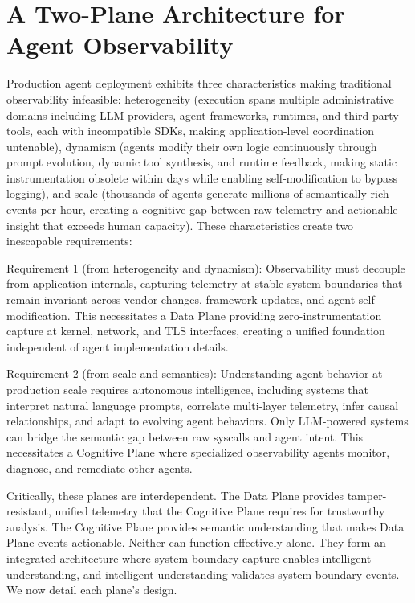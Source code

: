 \documentclass[sigplan,screen,9pt]{acmart}
\begin{document}
\section{A Two-Plane Architecture for Agent Observability}

Production agent deployment exhibits three characteristics making traditional observability infeasible: heterogeneity (execution spans multiple administrative domains including LLM providers, agent frameworks, runtimes, and third-party tools, each with incompatible SDKs, making application-level coordination untenable), dynamism (agents modify their own logic continuously through prompt evolution, dynamic tool synthesis, and runtime feedback, making static instrumentation obsolete within days while enabling self-modification to bypass logging), and scale (thousands of agents generate millions of semantically-rich events per hour, creating a cognitive gap between raw telemetry and actionable insight that exceeds human capacity). These characteristics create two inescapable requirements:

Requirement 1 (from heterogeneity and dynamism): Observability must decouple from application internals, capturing telemetry at stable system boundaries that remain invariant across vendor changes, framework updates, and agent self-modification. This necessitates a Data Plane providing zero-instrumentation capture at kernel, network, and TLS interfaces, creating a unified foundation independent of agent implementation details.

Requirement 2 (from scale and semantics): Understanding agent behavior at production scale requires autonomous intelligence, including systems that interpret natural language prompts, correlate multi-layer telemetry, infer causal relationships, and adapt to evolving agent behaviors. Only LLM-powered systems can bridge the semantic gap between raw syscalls and agent intent. This necessitates a Cognitive Plane where specialized observability agents monitor, diagnose, and remediate other agents.

Critically, these planes are interdependent. The Data Plane provides tamper-resistant, unified telemetry that the Cognitive Plane requires for trustworthy analysis. The Cognitive Plane provides semantic understanding that makes Data Plane events actionable. Neither can function effectively alone. They form an integrated architecture where system-boundary capture enables intelligent understanding, and intelligent understanding validates system-boundary events. We now detail each plane's design.
\end{document}
